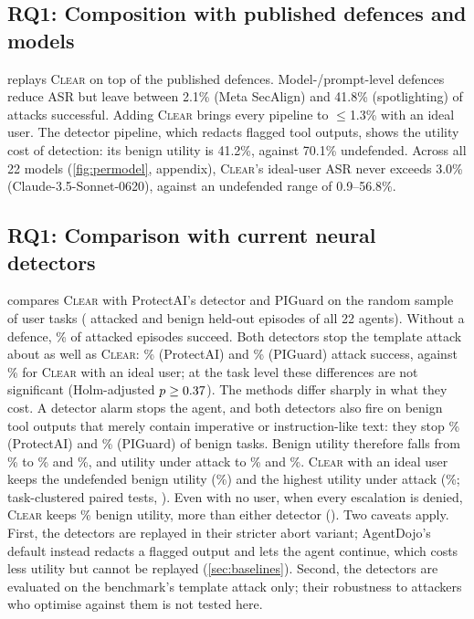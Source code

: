 \documentclass[preprint,12pt,nonatbib]{elsarticle}
\theoremstyle{remark}
\newcommand{\clear}{\textsc{Clear}}
\begin{document}
\subsection{RQ1: Composition with published defences and models}
\label{sec:pubdef}
 replays \clear{} on top of the published defences.
Model-/prompt-level defences reduce ASR but leave between 2.1\% (Meta
SecAlign) and 41.8\% (spotlighting) of attacks successful. Adding \clear{}
brings every pipeline to $\le$1.3\% with an ideal user. The detector pipeline,
which redacts flagged tool outputs, shows the utility cost of detection: its
benign utility is 41.2\%, against 70.1\% undefended. Across all 22 models
(\cref{fig:permodel}, appendix), \clear{}'s ideal-user ASR never exceeds 3.0\%
(Claude-3.5-Sonnet-0620), against an undefended range of 0.9--56.8\%.

\begin{table}[t]
\centering\small
\caption{Published defences replayed alone and with \clear{} (all four suites; \texttt{important\_instructions}). ``Dialogs'' are per benign task. The ASRs of the defences alone reproduce the published AgentDojo figures (GPT-4o: 47.7, 27.8, 41.7, 6.8, 8.0\%).}
\label{tab:pub}
\resizebox{\linewidth}{!}{}
\end{table}

\subsection{RQ1: Comparison with current neural detectors}
\label{sec:detectors}
 compares \clear{} with ProtectAI's detector and PIGuard on
the random sample of \nDetTasks{} user tasks (\nDetAtt{} attacked and \nDetBen{}
benign held-out episodes of all 22 agents). Without a defence, \asrNoneS\% of
attacked episodes succeed. Both detectors stop the template attack about as well
as \clear{}: \asrPai\% (ProtectAI) and \asrPig\% (PIGuard) attack success, against
\asrClearOS\% for \clear{} with an ideal user; at the task level these differences
are not significant (Holm-adjusted $p\ge0.37$). The methods differ sharply in
what they cost. A detector alarm stops the agent, and both detectors also fire on
benign tool outputs that merely contain imperative or instruction-like text: they
stop \stopPai\% (ProtectAI) and \stopPig\% (PIGuard) of benign tasks. Benign utility
therefore falls from \buNoneS\% to \buPai\% and \buPig\%, and utility under attack
to \uaPai\% and \uaPig\%. \clear{} with an ideal user keeps the undefended benign
utility (\buClearOS\%) and the highest utility under attack (\uaClearOS\%;
task-clustered paired tests, \detUtilOP). Even with no user, when every escalation
is denied, \clear{} keeps \buClearAS\% benign utility, more than either detector
(\detUtilP). Two caveats apply. First, the detectors are replayed in their stricter
abort variant; AgentDojo's default instead redacts a flagged output and lets the
agent continue, which costs less utility but cannot be replayed (\cref{sec:baselines}).
Second, the detectors are evaluated on the benchmark's template attack only; their
robustness to attackers who optimise against them is not tested here.
\end{document}
